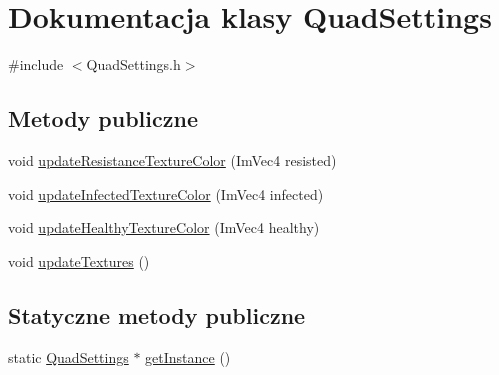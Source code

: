 \hypertarget{class_quad_settings}{}\section{Dokumentacja klasy Quad\+Settings}
\label{class_quad_settings}


{\ttfamily \#include $<$Quad\+Settings.\+h$>$}

\subsection*{Metody publiczne}
\begin{DoxyCompactItemize}
\item 
void \mbox{\hyperlink{class_quad_settings_a75688efe96a7a34aa87600cccfe4a40d}{update\+Resistance\+Texture\+Color}} (Im\+Vec4 resisted)
\item 
void \mbox{\hyperlink{class_quad_settings_aa880429606846a5d629a334859ae0f37}{update\+Infected\+Texture\+Color}} (Im\+Vec4 infected)
\item 
void \mbox{\hyperlink{class_quad_settings_a82d6bd77e99f58c1a24122548449c6bc}{update\+Healthy\+Texture\+Color}} (Im\+Vec4 healthy)
\item 
void \mbox{\hyperlink{class_quad_settings_a05e0e32535731778852480ab4c993cce}{update\+Textures}} ()
\end{DoxyCompactItemize}
\subsection*{Statyczne metody publiczne}
\begin{DoxyCompactItemize}
\item 
static \mbox{\hyperlink{class_quad_settings}{Quad\+Settings}} $\ast$ \mbox{\hyperlink{class_quad_settings_a20d7cfd0c56c11adcdf75c5e3011de67}{get\+Instance}} ()
\end{DoxyCompactItemize}
